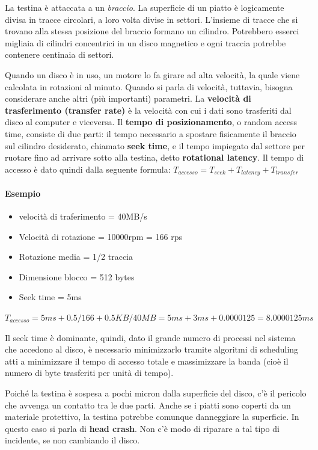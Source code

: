 \documentclass[a4paper]{article}
\begin{document}
La testina è attaccata a un \textit{braccio}. La superficie di un piatto è logicamente divisa in tracce circolari, a loro volta divise in settori. L'insieme di tracce che si trovano alla stessa posizione del braccio formano un cilindro. Potrebbero esserci migliaia di cilindri concentrici in un disco magnetico e ogni traccia potrebbe contenere centinaia di settori.

Quando un disco è in uso, un motore lo fa girare ad alta velocità, la quale viene calcolata in rotazioni al minuto. Quando si parla di velocità, tuttavia, bisogna considerare anche altri (più importanti) parametri. La \textbf{velocità di trasferimento (transfer rate)} è la velocità con cui i dati sono trasferiti dal disco al computer e viceversa. Il \textbf{tempo di posizionamento}, o random access time, consiste di due parti: il tempo necessario a spostare fisicamente il braccio sul cilindro desiderato, chiamato \textbf{seek time}, e il tempo impiegato dal settore per ruotare fino ad arrivare sotto alla testina, detto \textbf{rotational latency}.\newline
Il tempo di accesso è dato quindi dalla seguente formula: \newline
$ T_{accesso} = T_{seek} + T_{latency} + T_{transfer} $

\paragraph{Esempio}
\begin{itemize}
   \item velocità di traferimento = 40MB/s
   \item Velocità di rotazione = 10000rpm = 166 rps
   \item Rotazione media = 1/2 traccia
   \item Dimensione blocco = 512 bytes
   \item Seek time = 5ms
\end{itemize}
$ T_{accesso} = 5 ms + 0.5/166 + 0.5 KB/40 MB = 5 ms + 3 ms + 0.0000125 = 8.0000125 ms $
\newline

Il seek time è dominante, quindi, dato il grande numero di processi nel sistema che accedono al disco, è necessario minimizzarlo tramite algoritmi di scheduling atti a minimizzare il tempo di accesso totale e massimizzare la banda (cioè il numero di byte trasferiti per unità di tempo).

Poiché la testina è sospesa a pochi micron dalla superficie del disco, c'è il pericolo che avvenga un contatto tra le due parti. Anche se i piatti sono coperti da un materiale protettivo, la testina potrebbe comunque danneggiare la superficie. In questo caso si parla di \textbf{head crash}. Non c'è modo di riparare a tal tipo di incidente, se non cambiando il disco.
\end{document}
